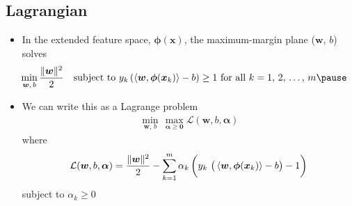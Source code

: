\begin{slide}
\section[-2]{Lagrangian}

\begin{PauseHighLight}
  \begin{itemize}
  \item In the extended feature space, $\bm{\phi}(\bm{x})$, the
    maximum-margin plane ($\bm{w}$, $b$) solves
   \begin{align*}
     \hspace*{-1em} \min_{\bm{w},\,b} \frac{\|\bm{w}\|^2}{2} \quad 
     \mbox{subject to $y_k\left(\inner{\bm{w}}{\bm{\phi}(\bm{x}_k)} -
     b\right) \geq 1$ for all $k=1,\,2,\,\ldots,\,m$}\pause
    \end{align*}
  \item We can write this as a Lagrange problem
    \begin{align*}
      \min_{\bm{w},\,b} \, \max_{\bm{\alpha}\geq\bm{0}} \mathcal{L}(\bm{w},b,\bm{\alpha})
    \end{align*}
    where
    \begin{align*}
      \mathcal{L}(\bm{w},b,\bm{\alpha}) = \frac{\|\bm{w}\|^2}{2}
      - \sum_{k=1}^m \alpha_k \left(\bigstrut  y_k\,\left( \strut\inner{\bm{w}}{\bm{\phi}(\bm{x}_k)} -
     b\right) - 1\right)
    \end{align*}
    subject to $\alpha_k \geq 0$\pause
  \end{itemize}
\end{PauseHighLight}


\end{slide}



